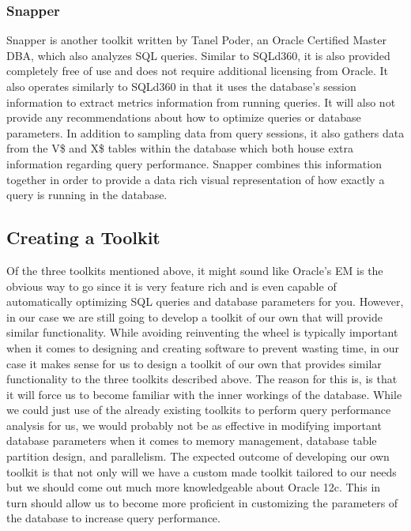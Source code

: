 \documentclass[draftclsnofoot, onecolumn, compsoc, 10pt]{IEEEtran}
\begin{document}
\subsubsection{Snapper}
Snapper is another toolkit written by Tanel Poder, an Oracle Certified Master DBA, which also analyzes SQL queries. 
Similar to SQLd360, it is also provided completely free of use and does not require additional licensing from Oracle. 
It also operates similarly to SQLd360 in that it uses the database’s session information to extract metrics information from running queries. 
It will also not provide any recommendations about how to optimize queries or database parameters. 
In addition to sampling data from query sessions, it also gathers data from the V\$ and X\$ tables within the database which both house extra information regarding query performance. 
Snapper combines this information together in order to provide a data rich visual representation of how exactly a query is running in the database. 

\subsection{Creating a Toolkit}
Of the three toolkits mentioned above, it might sound like Oracle’s EM is the obvious way to go since it is very feature rich and is even capable of automatically optimizing SQL queries and database parameters for you. 
However, in our case we are still going to develop a toolkit of our own that will provide similar functionality. 
While avoiding reinventing the wheel is typically important when it comes to designing and creating software to prevent wasting time, in our case it makes sense for us to design a toolkit of our own that provides similar functionality to the three toolkits described above. 
The reason for this is, is that it will force us to become familiar with the inner workings of the database. 
While we could just use of the already existing toolkits to perform query performance analysis for us, we would probably not be as effective in modifying important database parameters when it comes to memory management, database table partition design, and parallelism. 
The expected outcome of developing our own toolkit is that not only will we have a custom made toolkit tailored to our needs but we should come out much more knowledgeable about Oracle 12c. 
This in turn should allow us to become more proficient in customizing the parameters of the database to increase query performance.
\end{document}
